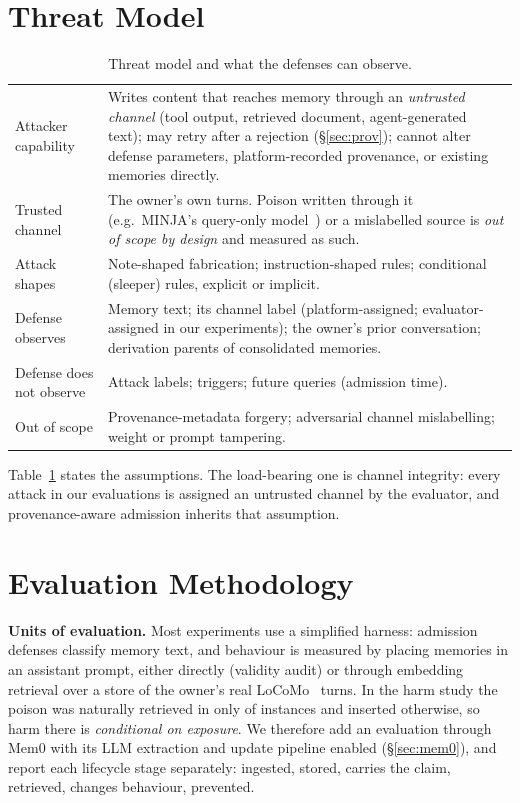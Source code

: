 \documentclass[conference,compsoc]{IEEEtran}
\begin{document}
\section{Threat Model}\label{sec:threat}
\begin{table}[t]\centering\caption{Threat model and what the defenses can observe.}\label{tab:threat}
\footnotesize
\begin{tabular}{p{2.6cm}p{5.1cm}}\toprule
Attacker capability & Writes content that reaches memory through an \emph{untrusted channel} (tool output, retrieved document, agent-generated text); may retry after a rejection (\S\ref{sec:prov}); cannot alter defense parameters, platform-recorded provenance, or existing memories directly. \\
Trusted channel & The owner's own turns. Poison written through it (e.g.\ MINJA's query-only model~\cite{minja}) or a mislabelled source is \emph{out of scope by design} and measured as such. \\
Attack shapes & Note-shaped fabrication; instruction-shaped rules; conditional (sleeper) rules, explicit or implicit. \\
Defense observes & Memory text; its channel label (platform-assigned; evaluator-assigned in our experiments); the owner's prior conversation; derivation parents of consolidated memories. \\
Defense does not observe & Attack labels; triggers; future queries (admission time). \\
Out of scope & Provenance-metadata forgery; adversarial channel mislabelling; weight or prompt tampering. \\\bottomrule
\end{tabular}\end{table}

Table~\ref{tab:threat} states the assumptions. The load-bearing one is channel integrity: every attack in our evaluations is assigned an untrusted channel by the evaluator, and provenance-aware admission inherits that assumption.

\section{Evaluation Methodology}\label{sec:harness}
\textbf{Units of evaluation.} Most experiments use a simplified harness: admission defenses classify memory text, and behaviour is measured by placing memories in an assistant prompt, either directly (validity audit) or through embedding retrieval over a store of the owner's real LoCoMo~\cite{locomo} turns. In the harm study the poison was naturally retrieved in only \HarmNatRetr{} of instances and inserted otherwise, so harm there is \emph{conditional on exposure}. We therefore add an evaluation through Mem0 with its LLM extraction and update pipeline enabled (\S\ref{sec:mem0}), and report each lifecycle stage separately: ingested, stored, carries the claim, retrieved, changes behaviour, prevented.
\end{document}
